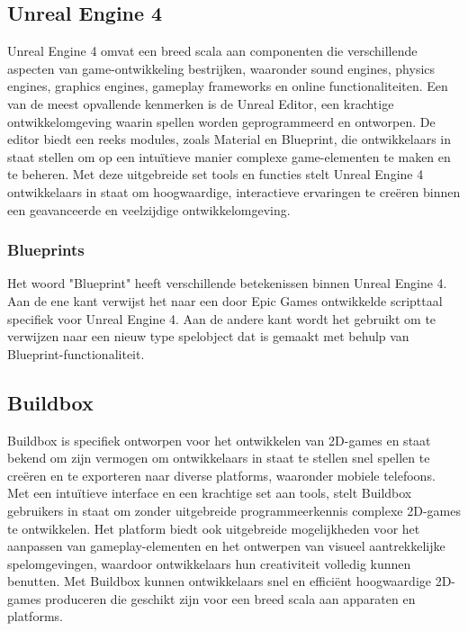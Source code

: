 \subsection{Unreal Engine 4}
Unreal Engine 4 omvat een breed scala aan componenten die verschillende aspecten van game-ontwikkeling bestrijken, waaronder sound engines, physics engines, graphics engines, gameplay frameworks en online functionaliteiten. Een van de meest opvallende kenmerken is de Unreal Editor, een krachtige ontwikkelomgeving waarin spellen worden geprogrammeerd en ontworpen. De editor biedt een reeks modules, zoals Material en Blueprint, die ontwikkelaars in staat stellen om op een intuïtieve manier complexe game-elementen te maken en te beheren. Met deze uitgebreide set tools en functies stelt Unreal Engine 4 ontwikkelaars in staat om hoogwaardige, interactieve ervaringen te creëren binnen een geavanceerde en veelzijdige ontwikkelomgeving. \autocite{lee2016learning}

\subsubsection{Blueprints}
Het woord "Blueprint" heeft verschillende betekenissen binnen Unreal Engine 4. Aan de ene kant verwijst het naar een door Epic Games ontwikkelde scripttaal specifiek voor Unreal Engine 4. Aan de andere kant wordt het gebruikt om te verwijzen naar een nieuw type spelobject dat is gemaakt met behulp van Blueprint-functionaliteit.
\autocite{romero2019blueprints}

\subsection{Buildbox}
Buildbox is specifiek ontworpen voor het ontwikkelen van 2D-games en staat bekend om zijn vermogen om ontwikkelaars in staat te stellen snel spellen te creëren en te exporteren naar diverse platforms, waaronder mobiele telefoons. Met een intuïtieve interface en een krachtige set aan tools, stelt Buildbox gebruikers in staat om zonder uitgebreide programmeerkennis complexe 2D-games te ontwikkelen. Het platform biedt ook uitgebreide mogelijkheden voor het aanpassen van gameplay-elementen en het ontwerpen van visueel aantrekkelijke spelomgevingen, waardoor ontwikkelaars hun creativiteit volledig kunnen benutten. Met Buildbox kunnen ontwikkelaars snel en efficiënt hoogwaardige 2D-games produceren die geschikt zijn voor een breed scala aan apparaten en platforms. \autocite{audronis2016buildbox}

